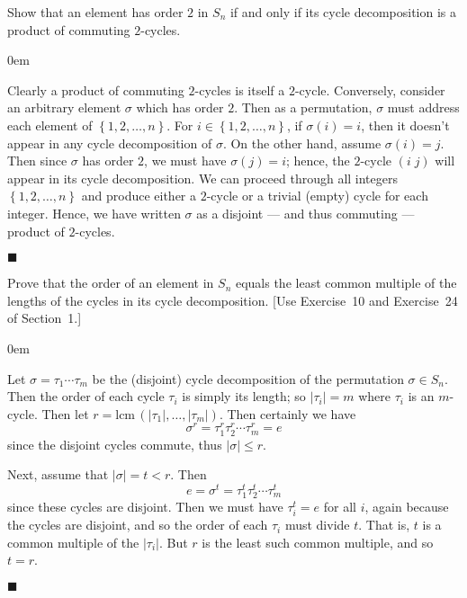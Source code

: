 \documentclass[12pt]{article}
\renewcommand{\qed}{\hfill$\blacksquare$}
\renewenvironment{proof}{\begin{addmargin}[1em]{0em}\begin{newproof}}{\end{newproof}\end{addmargin}\qed}
\newenvironment{problem}[2][Exercise]{\begin{trivlist}
\item[\hskip \labelsep {\bfseries #1}\hskip \labelsep {\bfseries #2.}]}{\end{trivlist}}
\begin{document}
\begin{problem}{1.3.13}
Show that an element has order $2$ in $S_n$ if and only if its cycle decomposition is a product of commuting $2$-cycles.
\end{problem}
\begin{proof}
Clearly a product of commuting $2$-cycles is itself a $2$-cycle. Conversely, consider an arbitrary element $\sigma$ which has order $2$. Then as a permutation, $\sigma$ must address each element of $\left\{1,2,\ldots,n\right\}$. For $i \in \left\{1,2,\ldots,n\right\}$, if $\sigma\left(i\right) = i$, then it doesn't appear in any cycle decomposition of $\sigma$. On the other hand, assume $\sigma\left(i\right)=j$. Then since $\sigma$ has order $2$, we must have $\sigma\left(j\right) = i$; hence, the $2$-cycle $\left(i\;j\right)$ will appear in its cycle decomposition. We can proceed through all integers $\left\{1,2,\ldots,n\right\}$ and produce either a $2$-cycle or a trivial (empty) cycle for each integer. Hence, we have written $\sigma$ as a disjoint --- and thus commuting --- product of $2$-cycles.
\end{proof}










\begin{problem}{1.3.15}
Prove that the order of an element in $S_n$ equals the least common multiple of the lengths of the cycles in its cycle decomposition. [Use Exercise~10 and Exercise~24 of Section~1.]
\end{problem}
\begin{proof}
Let $\sigma = \tau_1 \cdots \tau_m$ be the (disjoint) cycle decomposition of the permutation $\sigma \in S_n$. Then the order of each cycle $\tau_i$ is simply its length; so $\left|\tau_i\right|=m$ where $\tau_i$ is an $m$-cycle. Then let $r = \text{lcm}\,\left(\left|\tau_1\right|,\ldots,\left|\tau_m\right|\right)$. Then certainly we have \[ \sigma^r = \tau_1^r \tau_2^r \cdots \tau_m^r =e \] since the disjoint cycles commute, thus $\left|\sigma\right| \leq r$.

Next, assume that $\left|\sigma \right| = t < r$. Then \[ e = \sigma^t = \tau_1^t \tau_2^t \cdots \tau_m^t \] since these cycles are disjoint. Then we must have $\tau_i^t = e$ for all $i$, again because the cycles are disjoint, and so the order of each $\tau_i$ must divide $t$. That is, $t$ is a common multiple of the $\left|\tau_i\right|$. But $r$ is the least such common multiple, and so $t=r$.
\end{proof}
\end{document}
